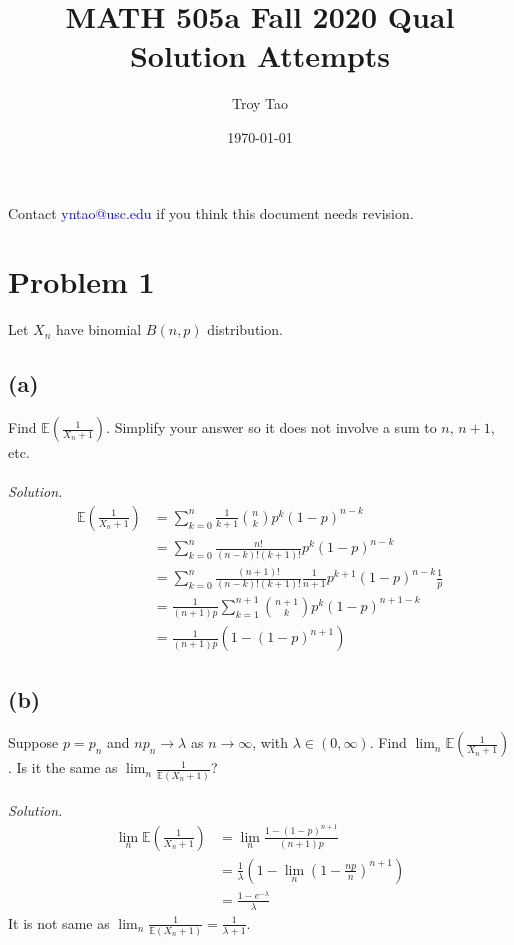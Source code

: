 \documentclass{article}
\title{MATH 505a Fall 2020 Qual Solution Attempts}
\author{Troy Tao}
\date\today
\newcommand{\E}{\mathbb{E}}
\begin{document}
\maketitle 
Contact \textcolor{blue}{yntao@usc.edu} if you think this document needs revision.

\section*{Problem 1}
Let $X_n$ have binomial $B(n,p)$ distribution.
\subsection*{(a)}
Find $\E(\frac{1}{X_n+1})$. Simplify your answer so it does not involve a sum to $n$, $n+1$, etc.\\\\
\color{blue}
\textit{Solution. }
\begin{equation*}
    \begin{split}
        \E\left(\frac{1}{X_n+1}\right) &=\sum_{k=0}^n \frac{1}{k+1} {n \choose k} p^k(1-p)^{n-k}\\
            &=\sum_{k=0}^n\frac{n!}{(n-k)!(k+1)!}p^k(1-p)^{n-k}\\
            &=\sum_{k=0}^n\frac{(n+1)!}{(n-k)!(k+1)!}\frac{1}{n+1} p^{k+1}(1-p)^{n-k} \frac{1}{p}\\
            &=\frac{1}{(n+1)p}\sum_{k=1}^{n+1}{n+1 \choose k}p^k(1-p)^{n+1-k}\\
            &=\frac{1}{(n+1)p}\left(1-(1-p)^{n+1}\right)
    \end{split}
\end{equation*}
\color{black}
\subsection*{(b)}
Suppose $p=p_n$ and $np_n \rightarrow \lambda$ as $n\rightarrow\infty$, with $\lambda \in (0,\infty)$. Find $\lim_n\E(\frac{1}{X_n+1})$. Is it the same as $\lim_n\frac{1}{\E(X_n+1)}$?\\\\
\color{blue}
\textit{Solution. }
\begin{equation*}
    \begin{split}
        \lim_n\E\left(\frac{1}{X_n+1}\right) &= \lim_n\frac{1-(1-p)^{n+1}}{(n+1)p}\\
            &= \frac{1}{\lambda}\left(1-\lim_n\left(1-\frac{np}{n}\right)^{n+1}\right)\\
            &= \frac{1-e^{-\lambda}}{\lambda}
    \end{split}
\end{equation*}
It is not same as $\lim_n \frac{1}{\E(X_n+1)} = \frac{1}{\lambda+1}$.
\color{black}
\end{document}
